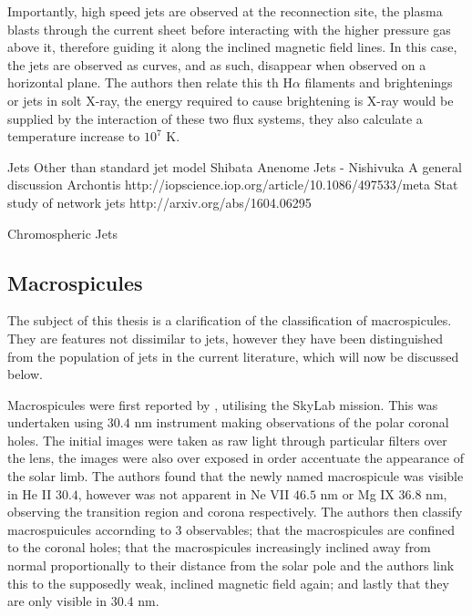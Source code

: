 Importantly, high speed jets are observed at the reconnection site, the plasma blasts through the current sheet before interacting with the higher pressure gas above it, therefore guiding it along the inclined magnetic field lines.
In this case, the jets are observed as curves, and as such, disappear when observed on a horizontal plane.
The authors then relate this th H$\alpha$ filaments and brightenings or jets in solt X-ray, the energy required to cause brightening is X-ray would be supplied by the interaction of these two flux systems, they also calculate a temperature increase to $10^7$ K.


 
 







Jets
Other than standard jet model Shibata
Anenome Jets - Nishivuka
A general discussion Archontis http://iopscience.iop.org/article/10.1086/497533/meta
Stat study of network jets http://arxiv.org/abs/1604.06295


Chromospheric Jets




\subsection{Macrospicules}


The subject of this thesis is a clarification of the classification of macrospicules. 
They are features not dissimilar to jets, however they have been distinguished from the population of jets in the current literature, which will now be discussed below.

Macrospicules were first reported by \cite{Bohlin1975}, utilising the SkyLab mission.
This was undertaken using $30.4$ nm instrument making observations of the polar coronal holes.
The initial images were taken as raw light through particular filters over the lens, the images were also over exposed in order accentuate the appearance of the solar limb.
The authors found that the newly named macrospicule was visible in He II $30.4$, however was not apparent in Ne VII $46.5$ nm or Mg IX $36.8$ nm, observing the transition region and corona respectively.
The authors then classify macrospuicules accornding to 3 observables; that the macrospicules are confined to the coronal holes; that the macrospicules increasingly inclined away from normal proportionally to their distance from the solar pole and the authors link this to the supposedly weak, inclined magnetic field again; and lastly that they are only visible in $30.4$ nm.
 
